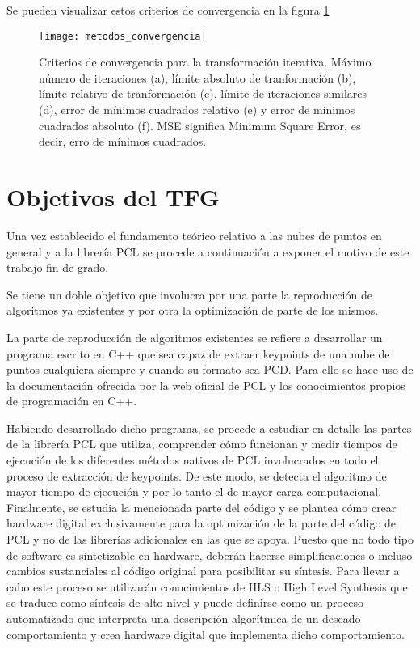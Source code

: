 Se pueden visualizar estos criterios de convergencia en la figura \ref{fig:metodos_convergencia}

\begin{figure}
\centering
\texttt{[image: metodos\_convergencia]}
\caption{Criterios de convergencia para la transformación iterativa. Máximo número de iteraciones (a), límite absoluto de tranformación (b), límite relativo de tranformación (c), límite de iteraciones similares (d), error de mínimos cuadrados relativo (e) y error de mínimos cuadrados absoluto (f). MSE significa Minimum Square Error, es decir, erro de mínimos cuadrados. }\label{fig:metodos_convergencia}
\end{figure}



\section{Objetivos del TFG}
Una vez establecido el fundamento teórico relativo a las nubes de puntos en general y a la librería PCL se procede a continuación a exponer el motivo de este trabajo fin de grado.

Se tiene un doble objetivo que involucra por una parte la reproducción de algoritmos ya existentes y por otra la optimización de parte de los mismos.

La parte de reproducción de algoritmos existentes se refiere a desarrollar un programa escrito en C++ que sea capaz de extraer keypoints de una nube de puntos cualquiera siempre y cuando su formato sea PCD. Para ello se hace uso de la documentación ofrecida por la web oficial de PCL y los conocimientos propios de programación en C++. 

Habiendo desarrollado dicho programa, se procede a estudiar en detalle las partes de la librería PCL que utiliza, comprender cómo funcionan y medir tiempos de ejecución de los diferentes métodos nativos de PCL involucrados en todo el proceso de extracción de keypoints. De este modo, se detecta el algoritmo de mayor tiempo de ejecución y por lo tanto el de mayor carga computacional. Finalmente, se estudia la mencionada parte del código y se plantea cómo crear hardware digital exclusivamente para la optimización de la parte del código de PCL y no de las librerías adicionales en las que se apoya. Puesto que no todo tipo de software es sintetizable en hardware, deberán hacerse simplificaciones o incluso cambios sustanciales al código original para posibilitar su síntesis. Para llevar a cabo este proceso se utilizarán conocimientos de HLS o High Level Synthesis que se traduce como síntesis de alto nivel y puede definirse como un proceso automatizado que interpreta una descripción algorítmica de un deseado comportamiento y crea hardware digital que implementa dicho comportamiento.

